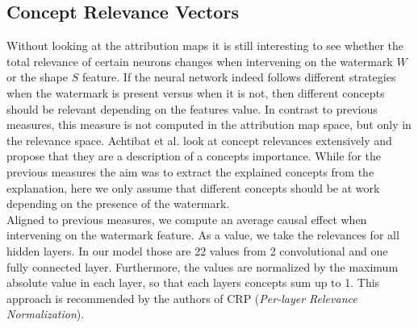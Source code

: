 \subsection{Concept Relevance Vectors}
Without looking at the attribution maps it is still interesting to see whether the total relevance of certain neurons changes when intervening on the watermark $W$ or the shape $S$ feature. If the neural network indeed follows different strategies when the watermark is present versus when it is not, then different concepts should be relevant depending on the features value. 
In contrast to previous measures, this measure is not computed in the attribution map space, but only in the relevance space. Achtibat et al. look at concept relevances extensively and propose that they are a description of a concepts importance. While for the previous measures the aim was to extract the explained concepts from the explanation, here we only assume that different concepts should be at work depending on the presence of the watermark.\\

Aligned to previous measures, we compute an average causal effect when intervening on the watermark feature. As a value, we take the relevances for all hidden layers. In our model those are 22 values from 2 convolutional and one fully connected layer. Furthermore, the values are normalized by the maximum absolute value in each layer, so that each layers concepts sum up to 1. This approach is recommended by the authors of CRP (\textit{Per-layer Relevance Normalization}). 


